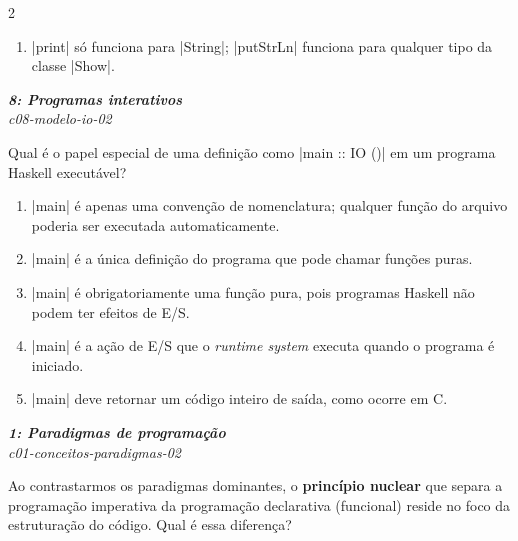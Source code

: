 \documentclass[a4paper,10pt,brazil]{article}
\begin{document}
\begin{multicols}{2}
\begin{enumerate}
  \item \haskellinline|print| só funciona para \haskellinline|String|; \haskellinline|putStrLn| funciona para qualquer tipo da classe \haskellinline|Show|.


\end{enumerate}

\begin{flushright}
  \footnotesize
  \textit{\textbf{8: Programas interativos}}\\
  \textit{c08-modelo-io-02}\\

\end{flushright}
Qual é o papel especial de uma definição como \haskellinline|main :: IO ()| em um programa Haskell executável?

\begin{enumerate}
  \item \haskellinline|main| é apenas uma convenção de nomenclatura; qualquer função do arquivo poderia ser executada automaticamente.

  \item \haskellinline|main| é a única definição do programa que pode chamar funções puras.

  \item \haskellinline|main| é obrigatoriamente uma função pura, pois programas Haskell não podem ter efeitos de E/S.

  \item \haskellinline|main| é a ação de E/S que o \emph{runtime system} executa quando o programa é iniciado.

  \item \haskellinline|main| deve retornar um código inteiro de saída, como ocorre em C.


\end{enumerate}

\begin{flushright}
  \footnotesize
  \textit{\textbf{1: Paradigmas de programação}}\\
  \textit{c01-conceitos-paradigmas-02}\\

\end{flushright}
Ao contrastarmos os paradigmas dominantes, o \textbf{princípio nuclear} que separa a programação imperativa da programação declarativa (funcional) reside no foco da estruturação do código. Qual é essa diferença?


\end{multicols}
\end{document}
